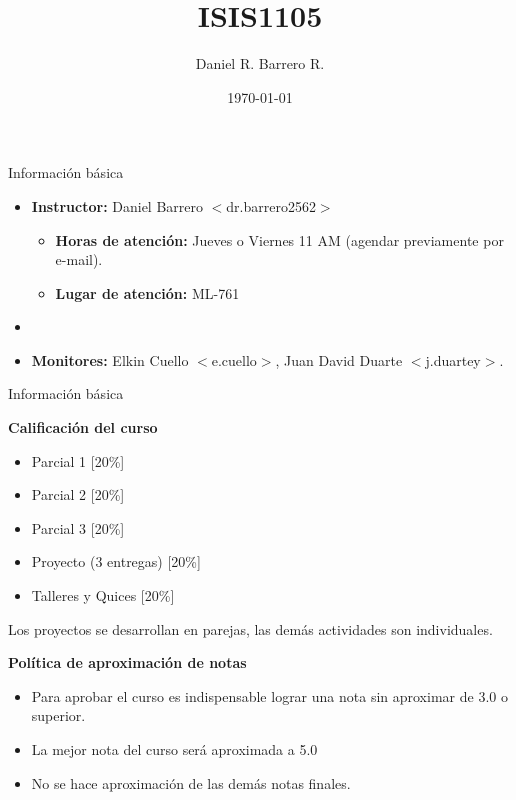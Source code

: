 \documentclass{beamer}
\title{ISIS1105}
\author{Daniel R. Barrero R.}
\date{\today}
\begin{document}
\frame{\titlepage}

%

\begin{frame}{Información básica}

\begin{itemize}
    \item \textbf{Instructor:} Daniel Barrero $<$dr.barrero2562$>$ \pause
    \begin{itemize}
        \item \textbf{Horas de atención:} Jueves o Viernes 11 AM (agendar previamente por e-mail).
        \item \textbf{Lugar de atención:} ML-761
    \end{itemize}
    \item[ ]\pause
    \item \textbf{Monitores:} Elkin Cuello $<$e.cuello$>$, Juan David Duarte $<$j.duartey$>$.
\end{itemize}
    
\end{frame}

%

\begin{frame}{Información básica}

\textbf{Calificación del curso} \pause

\begin{itemize}
    \item Parcial 1 [20\%]
    \item Parcial 2 [20\%]
    \item Parcial 3 [20\%] \pause
    \item Proyecto (3 entregas) [20\%] \pause
    \item Talleres y Quices [20\%] \pause
\end{itemize}

Los proyectos se desarrollan en parejas, las demás actividades son individuales. \\

\bigskip

\textbf{Política de aproximación de notas} \pause

\begin{itemize}
    \item Para aprobar el curso es indispensable lograr una nota sin aproximar de 3.0 o superior. \pause
    \item La mejor nota del curso será aproximada a 5.0 \pause
    \item No se hace aproximación de las demás notas finales. \pause
\end{itemize}
    
\end{frame}
\end{document}
